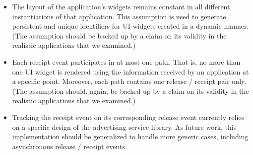 \documentclass[]{article}
\begin{document}
\begin{itemize}
\item The layout of the application's widgets remains constant in all different instantiations of that application. This assumption is used to generate persistent and unique identifiers for UI widgets created in a dynamic manner.
    (The assumption should be backed up by a claim on its validity in the realistic applications that we examined.)
\item Each receipt event participates in at most one path. That is, no more than one UI widget is rendered using the information received by an application at a specific point. 
    Moreover, each path contains one release / receipt pair only.
    (The assumption should, again, be backed up by a claim on its validity in the realistic applications that we examined.)
\item Tracking the receipt event on its corresponding release event currently relies on a specific design of the advertising service library. As future work, this implementation should be generalized to handle more generic cases, including asynchronous release / receipt events.    
\end{itemize}
\end{document}
